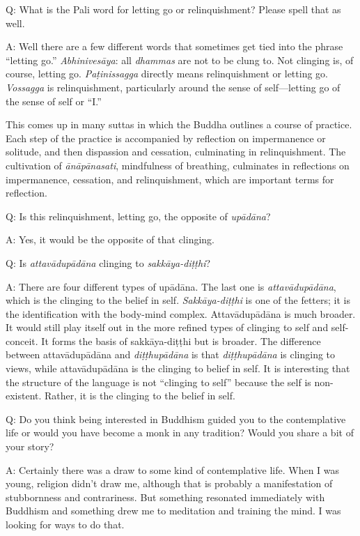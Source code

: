 \qaspace
Q: What is the Pali word for letting go or relinquishment? Please spell
that as well.

\qaspace
A: Well there are a few different words that sometimes get tied into the
phrase “letting go.” \emph{Abhinivesāya}: all \emph{dhammas} are not to
be clung to. Not clinging is, of course, letting go. \emph{Paṭinissagga}
directly means relinquishment or letting go. \emph{Vossagga} is
relinquishment, particularly around the sense of self—letting go of the
sense of self or “I.”

This comes up in many suttas in which the Buddha outlines a course of
practice. Each step of the practice is accompanied by reflection on
impermanence or solitude, and then dispassion and cessation, culminating
in relinquishment. The cultivation of \emph{ānāpānasati}, mindfulness of
breathing, culminates in reflections on impermanence, cessation, and
relinquishment, which are important terms for reflection.

\qaspace
Q: Is this relinquishment, letting go, the opposite of \emph{upādāna}?

\qaspace
A: Yes, it would be the opposite of that clinging.

\qaspace
Q: Is \emph{attavādupādāna} clinging to \emph{sakkāya-diṭṭhi}?

\qaspace
A: There are four different types of upādāna. The last one is
\emph{attavādupādāna}, which is the clinging to the belief in self.
\emph{Sakkāya-diṭṭhi} is one of the fetters; it is the identification
with the body-mind complex. Attavādupādāna is much broader. It would
still play itself out in the more refined types of clinging to self and
self-conceit. It forms the basis of sakkāya-diṭṭhi but is broader. The
difference between attavādupādāna and \emph{diṭṭhupādāna} is that
\emph{diṭṭhupādāna} is clinging to views, while attavādupādāna is the
clinging to belief in self. It is interesting that the structure of the
language is not “clinging to self” because the self is non-existent.
Rather, it is the clinging to the belief in self.

\qaspace
Q: Do you think being interested in Buddhism guided you to the
contemplative life or would you have become a monk in any tradition?
Would you share a bit of your story?

\qaspace
A: Certainly there was a draw to some kind of contemplative life. When I
was young, religion didn’t draw me, although that is probably a
manifestation of stubbornness and contrariness. But something resonated
immediately with Buddhism and something drew me to meditation and
training the mind. I was looking for ways to do that.

